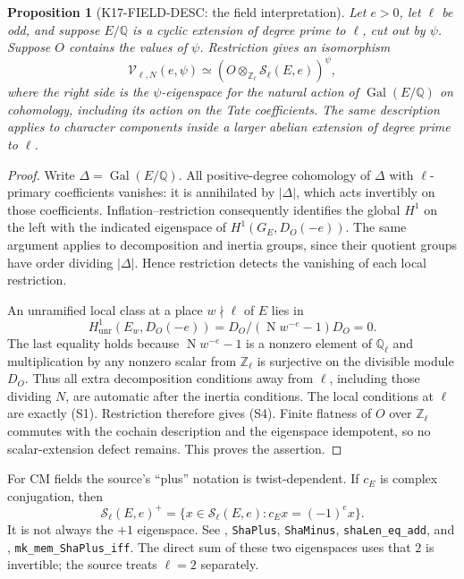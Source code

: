 \documentclass[11pt,a4paper]{article}
\newtheorem{proposition}[theorem]{Proposition}
\theoremstyle{definition}
\begin{document}
\begin{proposition}[K17-FIELD-DESC: the field interpretation]
Let $e>0$, let $\ell$ be odd, and suppose $E/\mathbb Q$ is a cyclic
extension of degree prime to $\ell$, cut out by $\psi$. Suppose $O$ contains
the values of $\psi$. Restriction gives an isomorphism
\[
 \mathcal V_{\ell,N}(e,\psi)
 \simeq
 \left(O\otimes_{\mathbb Z_\ell}\mathcal S_\ell(E,e)\right)^{\psi},
 \tag{S4}
\]
where the right side is the $\psi$-eigenspace for the natural action of
$\operatorname{Gal}(E/\mathbb Q)$ on cohomology, including its action on
the Tate coefficients. The same description applies to character components
inside a larger abelian extension of degree prime to $\ell$.
\end{proposition}
\begin{proof}
Write $\Delta=\operatorname{Gal}(E/\mathbb Q)$. All positive-degree
cohomology of $\Delta$ with $\ell$-primary coefficients vanishes: it is
annihilated by $|\Delta|$, which acts invertibly on those coefficients.
Inflation--restriction consequently identifies the global $H^1$ on the
left with the indicated eigenspace of $H^1(G_E,D_O(-e))$. The same argument
applies to decomposition and inertia groups, since their quotient groups
have order dividing $|\Delta|$. Hence restriction detects the vanishing of
each local restriction.

An unramified local class at a place $w\nmid\ell$ of $E$ lies in
\[
 H^1_{\mathrm{unr}}(E_w,D_O(-e))
 =D_O/(\operatorname{N}w^{-e}-1)D_O=0.
\]
The last equality holds because $\operatorname{N}w^{-e}-1$ is a nonzero
element of $\mathbb Q_\ell$ and multiplication by any nonzero scalar from
$\mathbb Z_\ell$ is surjective on the divisible module $D_O$.
Thus all extra decomposition conditions away from $\ell$, including
those dividing $N$, are automatic after the inertia conditions. The local
conditions at $\ell$ are exactly (S1). Restriction therefore gives (S4).
Finite flatness of $O$ over $\mathbb Z_\ell$ commutes with the cochain
description and the eigenspace idempotent, so no scalar-extension defect
remains. This proves the assertion.
\end{proof}

For CM fields the source's ``plus'' notation is twist-dependent. If $c_E$
is complex conjugation, then
\[
 \mathcal S_\ell(E,e)^+
 =\{x\in\mathcal S_\ell(E,e):c_E x=(-1)^e x\}.
 \tag{S5}
\]
It is not always the $+1$ eigenspace. See
, \texttt{ShaPlus}, \texttt{ShaMinus},
\texttt{shaLen\_eq\_add}, and
, \texttt{mk\_mem\_ShaPlus\_iff}.
The direct sum of these two eigenspaces uses that $2$ is invertible;
the source treats $\ell=2$ separately.
\end{document}
